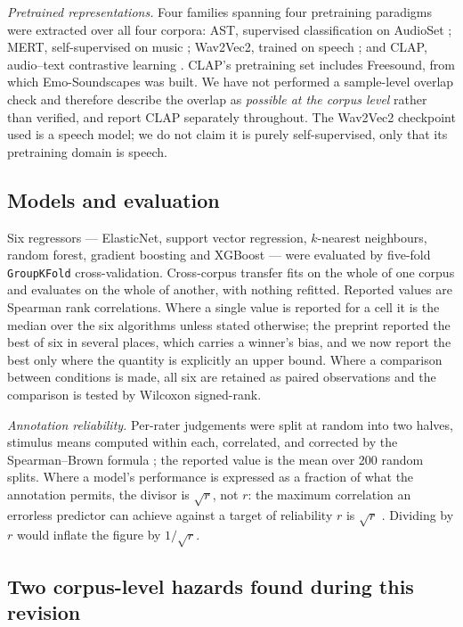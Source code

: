 \emph{Pretrained representations.} Four families spanning four pretraining
paradigms were extracted over all four corpora: AST, supervised
classification on AudioSet \cite{gong2021ast, gemmeke2017audioset}; MERT,
self-supervised on music \cite{li2024mert}; Wav2Vec2, trained on speech
\cite{baevski2020wav2vec2}; and CLAP, audio--text contrastive learning
\cite{wu2023clap}. CLAP's pretraining set includes Freesound, from which
Emo-Soundscapes was built. We have not performed a sample-level overlap check
and therefore describe the overlap as \emph{possible at the corpus level}
rather than verified, and report CLAP separately throughout. The Wav2Vec2
checkpoint used is a speech model; we do not claim it is purely
self-supervised, only that its pretraining domain is speech.

\subsection{Models and evaluation}

Six regressors --- ElasticNet, support vector regression, $k$-nearest
neighbours, random forest, gradient boosting and XGBoost \cite{chen2016xgboost}
--- were evaluated by five-fold \texttt{GroupKFold} cross-validation.
Cross-corpus transfer fits on the whole of one corpus and evaluates on the
whole of another, with nothing refitted. Reported values are Spearman rank
correlations. Where a single value is reported for a cell it is the median over
the six algorithms unless stated otherwise; the preprint reported the best of
six in several places, which carries a winner's bias, and we now report the
best only where the quantity is explicitly an upper bound. Where a comparison
between conditions is made, all six are retained as paired observations and
the comparison is tested by Wilcoxon signed-rank.

\emph{Annotation reliability.} Per-rater judgements were split at random into
two halves, stimulus means computed within each, correlated, and corrected by
the Spearman--Brown formula \cite{spearman1904}; the reported value is the mean
over 200 random splits. Where a model's performance is expressed as a fraction
of what the annotation permits, the divisor is $\sqrt{r}$, not $r$: the
maximum correlation an errorless predictor can achieve against a target of
reliability $r$ is $\sqrt{r}$ \cite{nunnally1994}. Dividing by $r$ would
inflate the figure by $1/\sqrt{r}$.

\subsection{Two corpus-level hazards found during this revision}
\label{sec:hazards}

